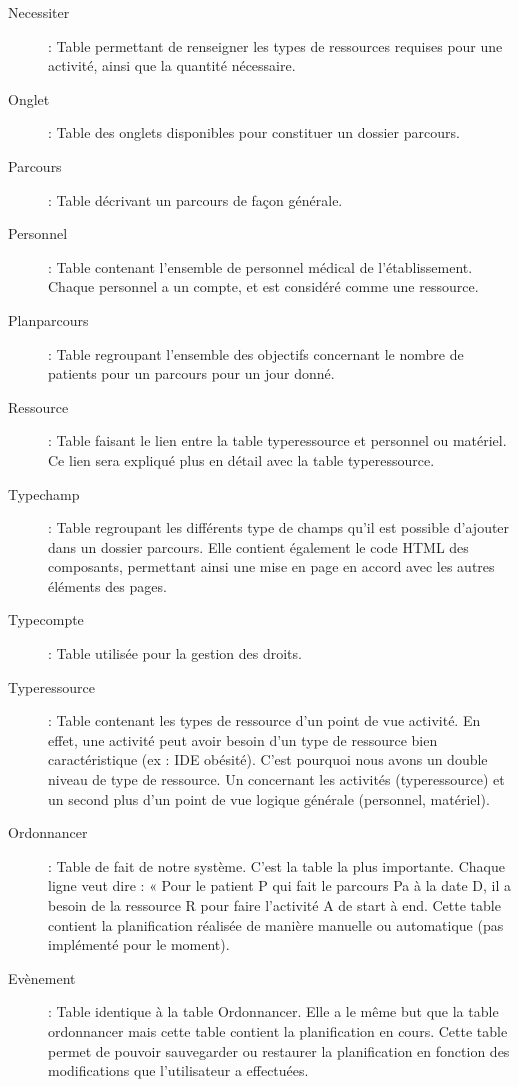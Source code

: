 \documentclass{polytech/polytech}
\begin{document}
\begin{description}
	\item[Necessiter] : Table permettant de renseigner les types de ressources requises pour une activité, ainsi que la quantité nécessaire.
	\item[Onglet] : Table des onglets disponibles pour constituer un dossier parcours.
	\item[Parcours]	 : Table décrivant un parcours de façon générale.
	\item[Personnel] : Table contenant l'ensemble de personnel médical de l'établissement. Chaque personnel a un compte, et est considéré comme une ressource.
	\item[Planparcours] : Table regroupant l'ensemble des objectifs concernant le nombre de patients pour un parcours pour un jour donné.
	\item[Ressource] : Table faisant le lien entre la table typeressource et personnel ou matériel. Ce lien	sera expliqué plus en détail avec la table typeressource.
	\item[Typechamp] : Table regroupant les différents type de champs qu'il est possible d'ajouter dans un dossier parcours. Elle contient également le code HTML des composants, permettant ainsi une	mise en page en accord avec les autres éléments des pages.
	\item[Typecompte] : Table utilisée pour la gestion des droits.
	\item[Typeressource] : Table contenant les types de ressource d'un point de vue activité. En effet, une activité peut avoir besoin d'un type de ressource bien caractéristique (ex : IDE obésité). C'est pourquoi nous avons un double niveau de type de ressource. Un concernant les activités (typeressource) et un second plus d’un point de vue logique générale (personnel, matériel).
	\item[Ordonnancer] : Table de fait de notre système. C'est la table la plus importante. Chaque ligne veut dire : « Pour le patient P qui fait le parcours Pa à la date D, il a besoin de la ressource R pour faire l’activité A de start à end. Cette table contient la planification réalisée de manière manuelle ou automatique (pas implémenté pour le moment).
	\item[Evènement] : Table identique à la table Ordonnancer. Elle a le même but que la table ordonnancer mais cette table contient la planification en cours. Cette table permet de pouvoir sauvegarder ou restaurer la planification en fonction des modifications que l’utilisateur a effectuées.
\end{description}
\end{document}
